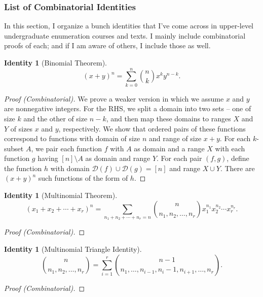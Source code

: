 \documentclass[12]{article}
\newcounter{identityCounter}
\newtheorem{iden}[identityCounter]{Identity}
\theoremstyle{definition}
\begin{document}
	\subsubsection{List of Combinatorial Identities}
	In this section, I organize a bunch identities that I've come across in upper-level undergraduate enumeration courses and texts.  I mainly include combinatorial proofs of each; and if I am aware of others, I include those as well.
	
	\begin{iden}[Binomial Theorem]
		$$(x+y)^n = \sum_{k=0}^n {n \choose k} x^k y^{n-k}.$$
	\end{iden}
	\begin{proof}[Proof (Combinatorial)]
		We prove a weaker version in which we assume $x$ and $y$ are nonnegative integers.  For the RHS, we split a domain into two sets -- one of size $k$ and the other of size $n-k$, and then map these domains to ranges $X$ and $Y$ of sizes $x$ and $y$, respectively.  We show that ordered pairs of these functions correspond to functions with domain of size $n$ and range of size $x+y$.  For each $k$-subset $A$, we pair each function $f$ with $A$ as domain and a range $X$ with each function $g$ having $[n] \setminus A$ as domain and range $Y$.  For each pair $(f,g)$, define the function $h$ with domain $\mathcal{D}(f) \cup \mathcal{D}(g) = [n]$ and range $X \cup Y$.  There are $(x+y)^n$ such functions of the form of $h$.
	\end{proof}

	\begin{iden}[Multinomial Theorem]
		$$(x_1 + x_2 + \cdots + x_r)^n = \sum_{n_1 + n_2 + \cdots + n_r = n} {n \choose n_1, n_2, \ldots, n_r}x_1^{n_1}x_2^{n_2}\cdots x_r^{n_r}.$$
	\end{iden}
	\begin{proof}[Proof (Combinatorial)]
		
	\end{proof}

	\begin{iden}[Multinomial Triangle Identity]
		$${n \choose n_1, n_2, \ldots, n_r} = \sum_{i=1}^r {n-1 \choose n_1, \ldots, n_{i-1}, n_i-1, n_{i+1}, \ldots, n_r}.$$
	\end{iden}
	\begin{proof}[Proof (Combinatorial)]
		
	\end{proof}
\end{document}
